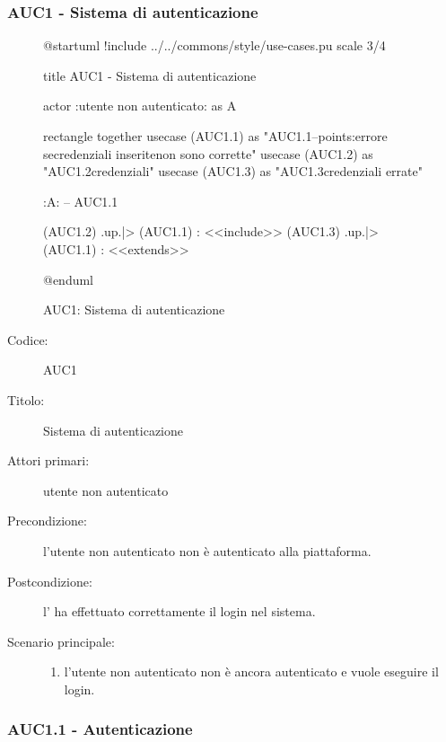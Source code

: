 \documentclass[casi-duso]{subfiles}
\begin{document}
\subsubsection{AUC1 - Sistema di autenticazione}%
\label{subsub:AUC1}

\begin{figure}[h!] 
  \centering 
  \begin{plantuml}
  @startuml
  !include ../../commons/style/use-cases.pu
  scale 3/4

  title AUC1 - Sistema di autenticazione

  actor :utente non autenticato: as A

  rectangle {
    together {
      usecase (AUC1.1) as "AUC1.1\nAutenticazione\n--\nExtension points:\nVisualizzazione errore se\nle credenziali inserite\n non sono corrette"
      usecase (AUC1.2) as "AUC1.2\nVerifica credenziali"
      usecase (AUC1.3) as "AUC1.3\nVisualizzazione credenziali errate"
    }
  }

  :A: -- AUC1.1

  (AUC1.2) .up.|> (AUC1.1) : <<include>>
  (AUC1.3) .up.|> (AUC1.1) : <<extends>>

  @enduml
  \end{plantuml} 
  \caption{AUC1: Sistema di autenticazione} 
  \label{fig:auc1} 
\end{figure}

\begin{description}
  \item[Codice:] AUC1
  \item[Titolo:] Sistema di autenticazione
  \item[Attori primari:] utente non autenticato
  \item[Precondizione:] l'utente non autenticato non è autenticato alla piattaforma.
  \item[Postcondizione:] l' ha effettuato correttamente il login nel sistema.
  \item[Scenario principale:]
  \begin{enumerate}
    \item l'utente non autenticato non è ancora autenticato e vuole eseguire il login.
  \end{enumerate}
\end{description}

\subsubsection{AUC1.1 - Autenticazione}%
\label{subsub:AUC1.1}
\end{document}
